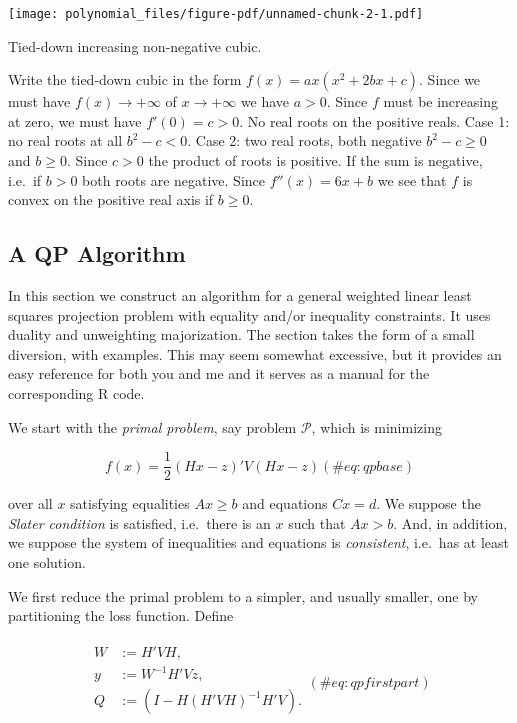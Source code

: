 \documentclass[
  12pt,
  letterpaper,
  DIV=11,
  numbers=noendperiod]{scrreprt}
\theoremstyle{remark}
\begin{document}
\texttt{[image: polynomial\_files/figure-pdf/unnamed-chunk-2-1.pdf]}

Tied-down increasing non-negative cubic.

Write the tied-down cubic in the form \(f(x)=ax(x^2+2bx+c)\). Since we
must have \(f(x)\rightarrow+\infty\) of \(x\rightarrow+\infty\) we have
\(a>0\). Since \(f\) must be increasing at zero, we must have
\(f'(0)=c>0\). No real roots on the positive reals. Case 1: no real
roots at all \(b^2-c<0\). Case 2: two real roots, both negative
\(b^2-c\geq 0\) and \(b\geq 0\). Since \(c>0\) the product of roots is
positive. If the sum is negative, i.e.~if \(b>0\) both roots are
negative. Since \(f''(x)=6x+b\) we see that \(f\) is convex on the
positive real axis if \(b\geq 0\).

\subsection{A QP Algorithm}\label{a-qp-algorithm}

In this section we construct an algorithm for a general weighted linear
least squares projection problem with equality and/or inequality
constraints. It uses duality and unweighting majorization. The section
takes the form of a small diversion, with examples. This may seem
somewhat excessive, but it provides an easy reference for both you and
me and it serves as a manual for the corresponding R code.

We start with the \emph{primal problem}, say problem \(\mathcal{P}\),
which is minimizing

\begin{equation}
f(x)=\frac12(Hx-z)'V(Hx-z)
(\#eq:qpbase)
\end{equation}

over all \(x\) satisfying equalities \(Ax\geq b\) and equations
\(Cx=d\). We suppose the \emph{Slater condition} is satisfied,
i.e.~there is an \(x\) such that \(Ax>b\). And, in addition, we suppose
the system of inequalities and equations is \emph{consistent}, i.e.~has
at least one solution.

We first reduce the primal problem to a simpler, and usually smaller,
one by partitioning the loss function. Define

\begin{align}
\begin{split}
W&:=H'VH,\\
y&:=W^{-1}H'Vz,\\
Q&:=(I-H(H'VH)^{-1}H'V).\\
\end{split}
(\#eq:qpfirstpart)
\end{align}
\end{document}
